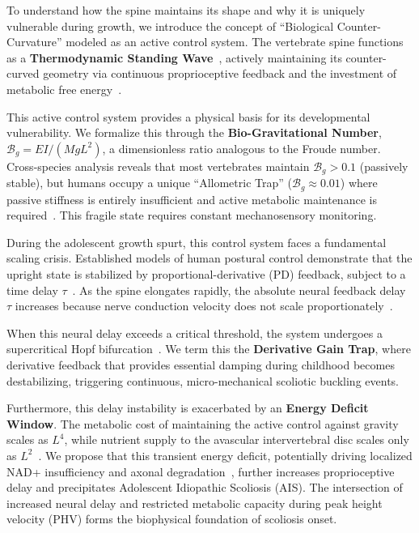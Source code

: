 \documentclass[11pt]{article}
\begin{document}
To understand how the spine maintains its shape and why it is uniquely vulnerable during growth, we introduce the concept of ``Biological Counter-Curvature'' modeled as an active control system. The vertebrate spine functions as a \textbf{Thermodynamic Standing Wave}~\cite{prigogine1977self}, actively maintaining its counter-curved geometry via continuous proprioceptive feedback and the investment of metabolic free energy~\cite{friston2013life}.

This active control system provides a physical basis for its developmental vulnerability. We formalize this through the \textbf{Bio-Gravitational Number}, $\mathcal{B}_g = EI / (M g L^2)$, a dimensionless ratio analogous to the Froude number. Cross-species analysis reveals that most vertebrates maintain $\mathcal{B}_g > 0.1$ (passively stable), but humans occupy a unique ``Allometric Trap'' ($\mathcal{B}_g \approx 0.01$) where passive stiffness is entirely insufficient and active metabolic maintenance is required~\cite{lovejoy2005hominid, Meyer_2021}. This fragile state requires constant mechanosensory monitoring.

During the adolescent growth spurt, this control system faces a fundamental scaling crisis. Established models of human postural control demonstrate that the upright state is stabilized by proportional-derivative (PD) feedback, subject to a time delay $\tau$~\cite{milton2009time, insperger2013acceleration}. As the spine elongates rapidly, the absolute neural feedback delay $\tau$ increases because nerve conduction velocity does not scale proportionately~\cite{lang1985nerve}.

When this neural delay exceeds a critical threshold, the system undergoes a supercritical Hopf bifurcation~\cite{landry2005dynamics}. We term this the \textbf{Derivative Gain Trap}, where derivative feedback that provides essential damping during childhood becomes destabilizing, triggering continuous, micro-mechanical scoliotic buckling events.

Furthermore, this delay instability is exacerbated by an \textbf{Energy Deficit Window}. The metabolic cost of maintaining the active control against gravity scales as $L^4$, while nutrient supply to the avascular intervertebral disc scales only as $L^2$~\cite{urban2004nutrition, sato2025convective}. We propose that this transient energy deficit, potentially driving localized NAD+ insufficiency and axonal degradation~\cite{basse2021nampt, gerdts2015sarm1}, further increases proprioceptive delay and precipitates Adolescent Idiopathic Scoliosis (AIS). The intersection of increased neural delay and restricted metabolic capacity during peak height velocity (PHV) forms the biophysical foundation of scoliosis onset.
\end{document}
